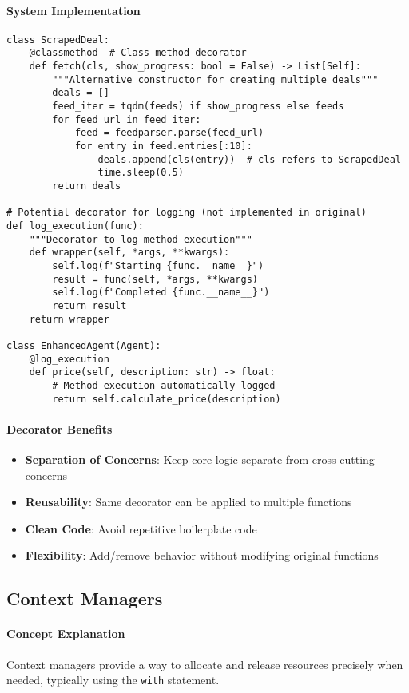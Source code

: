 \paragraph{System Implementation}
\begin{lstlisting}[caption=Decorators in Agent System]
class ScrapedDeal:
    @classmethod  # Class method decorator
    def fetch(cls, show_progress: bool = False) -> List[Self]:
        """Alternative constructor for creating multiple deals"""
        deals = []
        feed_iter = tqdm(feeds) if show_progress else feeds
        for feed_url in feed_iter:
            feed = feedparser.parse(feed_url)
            for entry in feed.entries[:10]:
                deals.append(cls(entry))  # cls refers to ScrapedDeal
                time.sleep(0.5)
        return deals

# Potential decorator for logging (not implemented in original)
def log_execution(func):
    """Decorator to log method execution"""
    def wrapper(self, *args, **kwargs):
        self.log(f"Starting {func.__name__}")
        result = func(self, *args, **kwargs)
        self.log(f"Completed {func.__name__}")
        return result
    return wrapper

class EnhancedAgent(Agent):
    @log_execution
    def price(self, description: str) -> float:
        # Method execution automatically logged
        return self.calculate_price(description)
\end{lstlisting}

\paragraph{Decorator Benefits}
\begin{itemize}
\item \textbf{Separation of Concerns}: Keep core logic separate from cross-cutting concerns
\item \textbf{Reusability}: Same decorator can be applied to multiple functions
\item \textbf{Clean Code}: Avoid repetitive boilerplate code
\item \textbf{Flexibility}: Add/remove behavior without modifying original functions
\end{itemize}

\subsection{Context Managers}

\paragraph{Concept Explanation}
Context managers provide a way to allocate and release resources precisely when needed, typically using the \texttt{with} statement.

